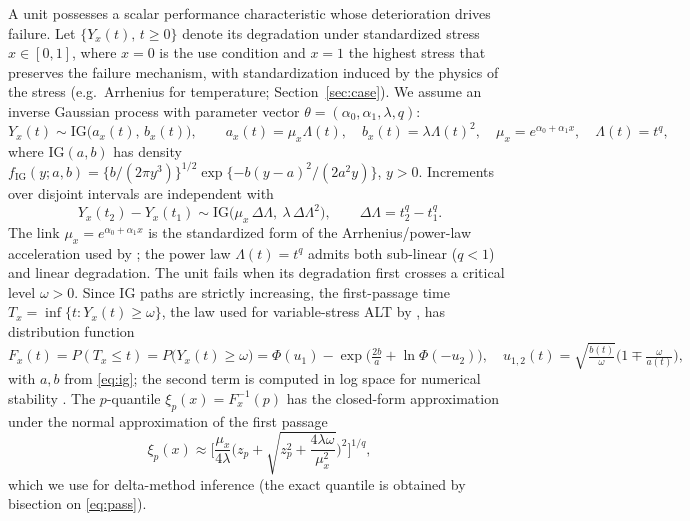 \documentclass[11pt]{article}
\begin{document}
A unit possesses a scalar performance characteristic whose deterioration drives failure. Let
$\{Y_x(t),\,t\ge 0\}$ denote its degradation under standardized stress $x\in[0,1]$, where $x=0$
is the use condition and $x=1$ the highest stress that preserves the failure mechanism, with
standardization induced by the physics of the stress (e.g.\ Arrhenius for temperature;
Section~\ref{sec:case}). We assume an inverse Gaussian process with parameter vector
$\theta=(\alpha_0,\alpha_1,\lambda,q)$:
\begin{equation}\label{eq:ig}
Y_x(t)\sim \mathrm{IG}\big(a_x(t),\,b_x(t)\big),\qquad
a_x(t)=\mu_x\Lambda(t),\quad b_x(t)=\lambda \Lambda(t)^2,\quad
\mu_x=e^{\alpha_0+\alpha_1 x},\quad \Lambda(t)=t^{q},
\end{equation}
where $\mathrm{IG}(a,b)$ has density $f_{\mathrm{IG}}(y;a,b)=\{b/(2\pi y^3)\}^{1/2}
\exp\{-b(y-a)^2/(2a^2y)\}$, $y>0$. Increments over disjoint intervals are independent with
\begin{equation}\label{eq:inc}
Y_x(t_2)-Y_x(t_1)\sim\mathrm{IG}\!\Big(\mu_x\,\Delta\Lambda,\ \lambda\,\Delta\Lambda^{2}\Big),
\qquad \Delta\Lambda=t_2^{q}-t_1^{q}.
\end{equation}
The link $\mu_x=e^{\alpha_0+\alpha_1 x}$ is the standardized form of the Arrhenius/power-law
acceleration used by \citet{Ma2021}; the power law $\Lambda(t)=t^{q}$ admits both
sub-linear ($q<1$) and linear degradation. The unit fails when its degradation first crosses a
critical level $\omega>0$. Since IG paths are strictly increasing, the first-passage time
$T_x=\inf\{t: Y_x(t)\ge\omega\}$, the law used for variable-stress ALT by
\citet{DoksumHoyland1992}, has distribution function
\begin{equation}\label{eq:pass}
F_x(t)=P(T_x\le t)=P\big(Y_x(t)\ge\omega\big)
=\Phi(u_1)-\exp\!\Big(\tfrac{2b}{a}+\ln\Phi(-u_2)\Big),\quad
u_{1,2}(t)=\sqrt{\tfrac{b(t)}{\omega}}\Big(1\mp\tfrac{\omega}{a(t)}\Big),
\end{equation}
with $a,b$ from \eqref{eq:ig}; the second term is computed in log space for numerical
stability \citep[cf.][]{WangWangDuan2016}. The $p$-quantile $\xi_p(x)=F_x^{-1}(p)$ has the
closed-form approximation under the normal approximation of the first passage
\citep{Ye2014,Ma2021}
\begin{equation}\label{eq:xi}
\xi_p(x)\approx\Bigg[\frac{\mu_x}{4\lambda}
\bigg(z_p+\sqrt{z_p^{2}+\frac{4\lambda\omega}{\mu_x^{2}}}\bigg)^{\!2}\Bigg]^{1/q},
\end{equation}
which we use for delta-method inference (the exact quantile is obtained by bisection on
\eqref{eq:pass}).
\end{document}
